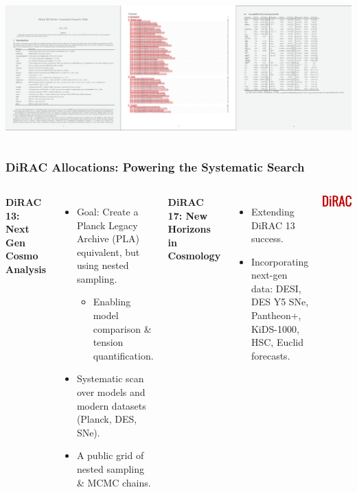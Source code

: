 \documentclass[aspectratio=169]{beamer}
\begin{document}
\begin{frame}
\begin{columns}
        \includegraphics[width=\textwidth]{figures/pla1}
    \end{columns}
\end{frame}


\begin{frame}
    \frametitle{DiRAC Allocations: Powering the Systematic Search}
    \begin{columns}[T]
        \textbf{DiRAC 13: Next Gen Cosmo Analysis}
        \begin{itemize}
            \item Goal: Create a Planck Legacy Archive (PLA) equivalent, but using nested sampling.
                \begin{itemize}
                    \item Enabling model comparison \& tension quantification.
                \end{itemize}
            \item Systematic scan over models and modern datasets (Planck, DES, SNe).
            \item A public grid of nested sampling  \& MCMC chains.
        \end{itemize}
        \vspace{1em}
        \textbf{DiRAC 17: New Horizons in Cosmology}
        \begin{itemize}
            \item Extending DiRAC 13 success.
            \item Incorporating next-gen data: DESI, DES Y5 SNe, Pantheon+, KiDS-1000, HSC, Euclid forecasts.
        \end{itemize}

        \includegraphics[width=\textwidth]{logos/dirac.png} %
    \end{columns}
\end{frame}
\end{document}
